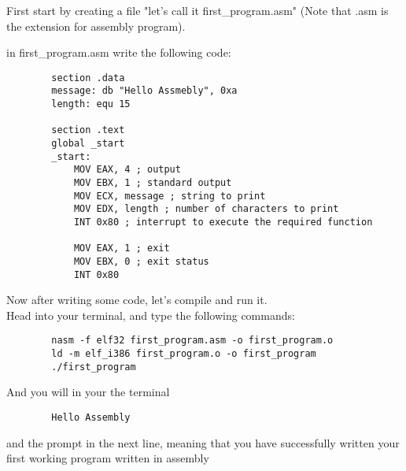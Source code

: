 \documentclass[10pt]{article}
\begin{document}
    First start by creating a file "let's call it first\_program.asm" (Note that .asm is the extension for assembly program).

    in first\_program.asm write the following code: 

    \begin{verbatim}
        section .data
        message: db "Hello Assmebly", 0xa
        length: equ 15

        section .text
        global _start
        _start:
            MOV EAX, 4 ; output
            MOV EBX, 1 ; standard output
            MOV ECX, message ; string to print
            MOV EDX, length ; number of characters to print
            INT 0x80 ; interrupt to execute the required function

            MOV EAX, 1 ; exit
            MOV EBX, 0 ; exit status
            INT 0x80 
    \end{verbatim}
    Now after writing some code, let's compile and run it.\\
    Head into your terminal, and type the following commands:
    \begin{verbatim}
        nasm -f elf32 first_program.asm -o first_program.o
        ld -m elf_i386 first_program.o -o first_program
        ./first_program
    \end{verbatim}
    And you will in your the terminal
    \begin{verbatim}
        Hello Assembly
    \end{verbatim}
    and the prompt in the next line, meaning that you have successfully written your first working program written in assembly
\end{document}
